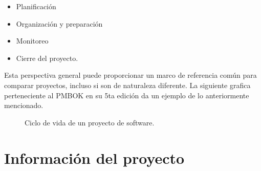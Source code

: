 \begin{itemize}
\item Planificación
\item Organización y preparación
\item Monitoreo
\item Cierre del proyecto.
\end{itemize}
Esta perspectiva general puede proporcionar un marco de referencia común para comparar proyectos, incluso si son de naturaleza diferente. La siguiente grafica perteneciente al PMBOK en su 5ta edición da un ejemplo de lo anteriormente mencionado. 
\begin{figure}[htbp!]
	\begin{center}
		\caption{Ciclo de vida de un proyecto de software.}
		\label{fig:ciclodevidadeunproyecto}
	\end{center}
\end{figure}


\section{Información del proyecto}	

